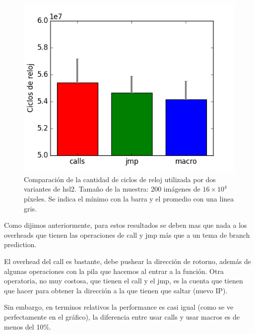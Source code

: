 \begin{figure}[H] 
	\centering
  \includegraphics[scale=0.7]{images/hsl-jmpcall.png}
  \caption{Comparación de la cantidad de ciclos de reloj utilizada por dos variantes de hsl2. Tamaño de la muestra: 200 imágenes de $16 \times 10^4$ píxeles. Se indica el mínimo con la barra y el promedio con una linea gris.}
\end{figure}

Como dijimos anteriormente, para estos resultados se deben mas que nada a los overheads que tienen las operaciones de call y jmp más que a un tema de branch prediction.

El overhead del call es bastante, debe pushear la dirección de rotorno, además de algunas operaciones con la pila que hacemos al entrar a la función. Otra operatoria, no muy costosa, que tienen el call y el jmp, es la cuenta que tienen que hacer para obtener la dirección a la que tienen que saltar (nuevo IP).

Sin embargo, en terminos relativos la performance es casi igual (como se ve perfectamente en el gráfico), la diferencia entre usar calls y usar macros es de menos del 10\%.


